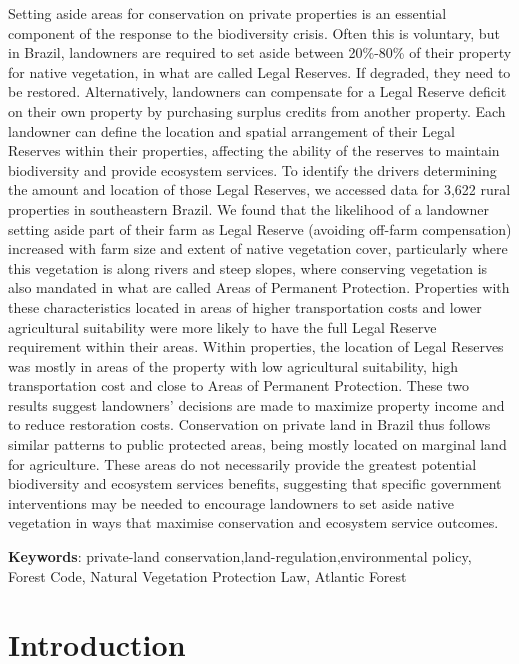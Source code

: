 \documentclass[
	12pt,				%
	oneside,			%
	a4paper,			%
	chapter=TITLE,		%
	section=TITLE,		%
	brazil,			%
	english				%
	]{abntex2}
\begin{document}
Setting aside areas for conservation on private properties is an essential component of the response to the biodiversity crisis. Often this is voluntary, but in Brazil, landowners are required to set aside between 20\%-80\% of their property for native vegetation, in what are called Legal Reserves. If degraded, they need to be restored. Alternatively, landowners can compensate for a Legal Reserve deficit on their own property by purchasing surplus credits from another property. Each landowner can define the location and spatial arrangement of their Legal Reserves within their properties, affecting the ability of the reserves to maintain biodiversity and provide ecosystem services. To identify the drivers determining the amount and location of those Legal Reserves, we accessed data for 3,622 rural properties in southeastern Brazil. We found that the likelihood of a landowner setting aside part of their farm as Legal Reserve (avoiding off-farm compensation) increased with farm size and extent of native vegetation cover, particularly where this vegetation is along rivers and steep slopes, where conserving vegetation is also mandated in what are called Areas of Permanent Protection. Properties with these characteristics located in areas of higher transportation costs and lower agricultural suitability were more likely to have the full Legal Reserve requirement within their areas. Within properties, the location of Legal Reserves was mostly in areas of the property with low agricultural suitability, high transportation cost and close to Areas of Permanent Protection. These two results suggest landowners' decisions are made to maximize property income and to reduce restoration costs. Conservation on private land in Brazil thus follows similar patterns to public protected areas, being mostly located on marginal land for agriculture. These areas do not necessarily provide the greatest potential biodiversity and ecosystem services benefits, suggesting that specific government interventions may be needed to encourage landowners to set aside native vegetation in ways that maximise conservation and ecosystem service outcomes.
\begin{flushleft}

\textbf{Keywords}: private-land conservation,land-regulation,environmental policy, Forest Code,
  Natural Vegetation Protection Law, Atlantic Forest

\end{flushleft}
\hypertarget{introduction}{%
\section{Introduction}\label{introduction}}
\end{document}
